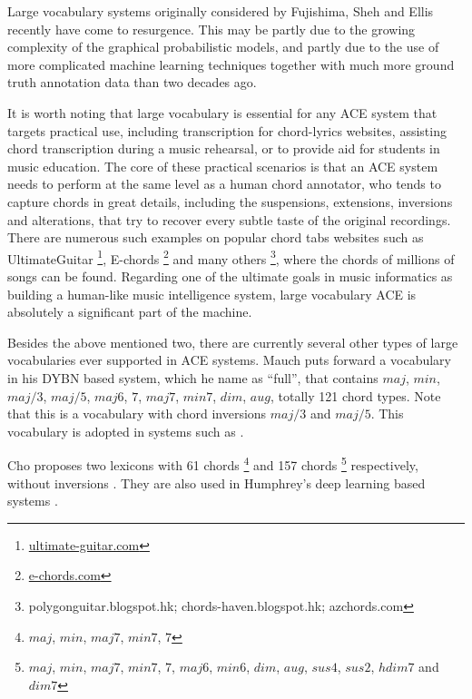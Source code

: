 \label{sec:2-largevocab}
Large vocabulary systems originally considered by Fujishima, Sheh and Ellis \cite{fujishima1999realtime,sheh2003chord} recently have come to resurgence. This may be partly due to the growing complexity of the graphical probabilistic models, and partly due to the use of more complicated machine learning techniques together with much more ground truth annotation data than two decades ago.

It is worth noting that large vocabulary is essential for any ACE system that targets practical use, including transcription for chord-lyrics websites, assisting chord transcription during a music rehearsal, or to provide aid for students in music education. The core of these practical scenarios is that an ACE system needs to perform at the same level as a human chord annotator, who tends to capture chords in great details, including the suspensions, extensions, inversions and alterations, that try to recover every subtle taste of the original recordings. There are numerous such examples on popular chord tabs websites such as UltimateGuitar \footnote{\url{ultimate-guitar.com}}, E-chords \footnote{\url{e-chords.com}} and many others \footnote{polygonguitar.blogspot.hk; chords-haven.blogspot.hk; azchords.com}, where the chords of millions of songs can be found. Regarding one of the ultimate goals in music informatics as building a human-like music intelligence system, large vocabulary ACE is absolutely a significant part of the machine.

Besides the above mentioned two, there are currently several other types of large vocabularies ever supported in ACE systems. Mauch \cite{mauch2010automatic} puts forward a vocabulary in his DYBN based system, which he name as ``full'', that contains $maj$, $min$, $maj/3$, $maj/5$, $maj6$, $7$, $maj7$, $min7$, $dim$, $aug$, totally 121 chord types. Note that this is a vocabulary with chord inversions $maj/3$ and $maj/5$. This vocabulary is adopted in systems such as \cite{ni2012end,mcvicar2014automatic,boulanger2013audio}.

Cho \cite{cho2014improved} proposes two lexicons with 61 chords \footnote{$maj$, $min$, $maj7$, $min7$, $7$} and 157 chords \footnote{$maj$, $min$, $maj7$, $min7$, $7$, $maj6$, $min6$, $dim$, $aug$, $sus4$, $sus2$, $hdim7$ and $dim7$} respectively, without inversions \cite{burgoyne2014comparative}. They are also used in Humphrey's deep learning based systems \cite{humphreyfour,humphrey2015exploration}.

